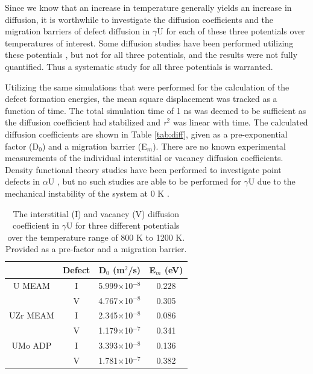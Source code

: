 \documentclass[review]{elsarticle}
\begin{document}
\FloatBarrier

Since we know that an increase in temperature generally yields an increase in diffusion, it is worthwhile to investigate the diffusion coefficients and the migration barriers of defect diffusion in $\gamma$U for each of these three potentials over temperatures of interest. Some diffusion studies have been performed utilizing these potentials \cite{smirnovaADP, smirnova2015}, but not for all three potentials, and the results were not fully quantified. Thus a systematic study for all three potentials is warranted.

Utilizing the same simulations that were performed for the calculation of the defect formation energies, the mean square displacement was tracked as a function of time. The total simulation time of 1 ns was deemed to be sufficient as the diffusion coefficient had stabilized and \textit{r}$^{2}$ was linear with time. The calculated diffusion coefficients are shown in Table \ref{tab:diff}, given as a pre-exponential factor (D$_{0}$) and a migration barrier (E$_{m}$). There are no known experimental measurements of the individual interstitial or vacancy diffusion coefficients. Density functional theory studies have been performed to investigate point defects in $\alpha$U \cite{wirth2011}, but no such studies are able to be performed for $\gamma$U due to the mechanical instability of the system at 0 K \cite{beeler2010}.

\begin{table}[h]
\caption{The interstitial (I) and vacancy (V) diffusion coefficient in $\gamma$U for three different potentials over the temperature range of 800 K to 1200 K. Provided as a pre-factor and a migration barrier.} \label{tab:diff}
\begin{center}
\begin{tabular}{|c|c|c|c|}
	\hline
	& Defect & D$_{0}$ (m$^{2}$/s) & E$_{m}$ (eV)\\
	 \hline
	U MEAM & I & 5.999$\times$10$^{-8}$ & 0.228 \\
			& V & 4.767$\times$10$^{-8}$ & 0.305 \\
			\hline
	UZr MEAM & I & 2.345$\times$10$^{-8}$ & 0.086 \\
			& V & 1.179$\times$10$^{-7}$ & 0.341 \\
			\hline
	UMo ADP & I & 3.393$\times$10$^{-8}$ & 0.136 \\
			& V & 1.781$\times$10$^{-7}$ & 0.382 \\
	\hline
\end{tabular}
\end{center}
\label{default}
\end{table}
\end{document}
